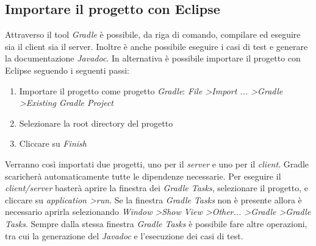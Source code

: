 \documentclass{article}
\begin{document}
	\subsection {Importare il progetto con Eclipse}
	Attraverso il tool \textit{Gradle} è possibile, da riga di comando,
	compilare ed eseguire sia il client sia il server. Inoltre è anche
	possibile eseguire i casi di test e generare la documentazione
	\textit{Javadoc}.
	In alternativa è possibile importare il progetto con
	Eclipse seguendo i seguenti passi:
	\begin{enumerate}
		\item Importare il progetto come progetto \textit{Gradle}:
			\textit{File \textgreater Import ... \textgreater Gradle
			\textgreater Existing Gradle Project}
		\item Selezionare la root directory del progetto
		\item Cliccare su \textit{Finish}
	\end{enumerate}
	Verranno così importati due progetti, uno per il \textit{server} e uno
	per il \textit{client}. Gradle scaricherà automaticamente tutte le
	dipendenze necessarie. Per eseguire il \textit{client/server} basterà
	aprire la finestra dei \textit{Gradle Tasks}, selezionare il progetto,
	e cliccare su \textit{application \textgreater run}. Se la finestra
	\textit{Gradle Tasks} non è presente allora è necessario aprirla
	selezionando \textit{Window \textgreater Show View \textgreater Other...
	\textgreater Gradle \textgreater Gradle Tasks}. Sempre dalla stessa
	finestra \textit{Gradle Tasks} è possibile fare altre operazioni, tra
	cui la generazione del \textit{Javadoc} e l'esecuzione dei casi di test.
\end{document}
